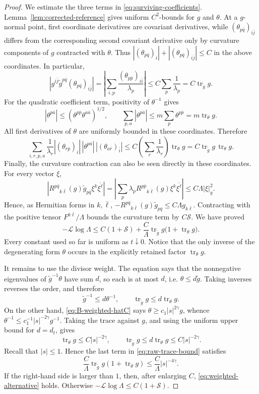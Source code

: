 \documentclass[10pt,a4paper]{amsart}
\newcommand{\tr}{\operatorname{tr}}
\begin{document}
\begin{proof}
We estimate the three terms in
\eqref{eq:surviving-coefficients}.
Lemma~\ref{lem:corrected-reference} gives uniform
$C^2$-bounds for $g$ and $\theta$.  At a $g$-normal point,
first coordinate derivatives are covariant derivatives, while
$(\theta_{p\bar q})_{i\bar j}$ differs from the corresponding second
covariant derivative only by curvature components of $g$ contracted
with $\theta$.  Thus
$|(\theta_{p\bar q})_i|+|(\theta_{p\bar q})_{i\bar j}|\leq C$ in
the above coordinates.  In particular,
\[
 \left|g^{i\bar j}\widetilde g^{p\bar q}
 (\theta_{p\bar q})_{i\bar j}\right|
 =\left|\sum_{i,p}\frac{(\theta_{p\bar p})_{i\bar i}}
 {\lambda_p}\right|
 \leq C\sum_p\frac1{\lambda_p}
 =C\tr_{\widetilde g}g.
\]
For the quadratic coefficient term, positivity of $\theta^{-1}$
gives
\[
 |\theta^{p\bar a}|
 \leq(\theta^{p\bar p}\theta^{a\bar a})^{1/2},
 \qquad
 \sum_{p,a}|\theta^{p\bar a}|
 \leq m\sum_p\theta^{p\bar p}=m\tr_\theta g.
\]
All first derivatives of $\theta$ are uniformly bounded in these
coordinates.  Therefore
\[
 \sum_{i,r,p,a}\frac1{\lambda_r}
 |(\theta_{r\bar p})_i|\,|\theta^{p\bar a}|\,
 |(\theta_{a\bar r})_{\bar i}|
 \leq C\left(\sum_r\frac1{\lambda_r}\right)\tr_\theta g
 =C\tr_{\widetilde g}g\,\tr_\theta g.
\]
Finally, the curvature contraction can also be seen directly in these
coordinates.  For every vector $\xi$,
\[
 \left|R^{p\bar q}{}_{k\bar\ell}(g)
 \widetilde g_{p\bar q}\xi^k\overline{\xi^\ell}\right|
 =\left|\sum_p\lambda_pR^{p\bar p}{}_{k\bar\ell}(g)
 \xi^k\overline{\xi^\ell}\right|
 \leq C\Lambda|\xi|_g^2.
\]
 Hence, as Hermitian forms in
$k,\bar\ell$,
$-R^{p\bar q}{}_{k\bar\ell}(g)\widetilde g_{p\bar q}
\leq C\Lambda g_{k\bar\ell}$.
Contracting with the positive tensor $F^{k\bar\ell}/\Lambda$
bounds the curvature term by $C\mathcal S$.  We have proved
\begin{equation}\label{eq:raw-trace-bound}
 -\mathcal L\log\Lambda
 \leq C(1+\mathcal S)
 +\frac{C}{\Lambda}\tr_{\widetilde g}g
       \bigl(1+\tr_\theta g\bigr).
\end{equation}
Every constant used so far is uniform as $t\downarrow0$.  Notice
that the only inverse of the degenerating form $\theta$ occurs in
the explicitly retained factor $\tr_\theta g$.

It remains to use the divisor weight.  The equation says that the
nonnegative eigenvalues of $\widetilde g^{-1}\theta$ have sum $d$,
so each is at most $d$, i.e. $\theta\leq d\widetilde g$.
Taking inverses reverses the order, and therefore
\[
 \widetilde g^{-1}\leq d\theta^{-1},
 \qquad
 \tr_{\widetilde g}g\leq d\tr_\theta g.
\]
On the other hand, \eqref{eq:B-weighted-hatC} says
$\theta\geq c_1|s|^{2\gamma}g$, whence
$\theta^{-1}\leq c_1^{-1}|s|^{-2\gamma}g^{-1}$.  Taking the trace
against $g$, and using the uniform upper bound for $d=d_t$, gives
\[
 \tr_\theta g\leq C|s|^{-2\gamma},
 \qquad
 \tr_{\widetilde g}g\leq d\tr_\theta g
 \leq C|s|^{-2\gamma}.
\]
Recall that $|s|\leq1$.  Hence the last term in
\eqref{eq:raw-trace-bound} satisfies
\[
 \frac{C}{\Lambda}\tr_{\widetilde g}g
       (1+\tr_\theta g)
 \leq\frac{C}{\Lambda}|s|^{-4\gamma}.
\]
If the right-hand side is larger than $1$, then, after enlarging $C$,
\eqref{eq:weighted-alternative} holds.  Otherwise
$-\mathcal L\log\Lambda\leq C(1+\mathcal S)$.


\end{proof}
\end{document}
